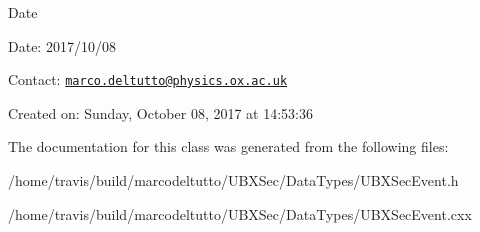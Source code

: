 \begin{DoxyDate}{Date}

\end{DoxyDate}
\begin{DoxyParagraph}{Date\-:}
2017/10/08 
\end{DoxyParagraph}


Contact\-: \href{mailto:marco.deltutto@physics.ox.ac.uk}{\tt marco.\-deltutto@physics.\-ox.\-ac.\-uk}

Created on\-: Sunday, October 08, 2017 at 14\-:53\-:36 

The documentation for this class was generated from the following files\-:\begin{DoxyCompactItemize}
\item 
/home/travis/build/marcodeltutto/\-U\-B\-X\-Sec/\-Data\-Types/U\-B\-X\-Sec\-Event.\-h\item 
/home/travis/build/marcodeltutto/\-U\-B\-X\-Sec/\-Data\-Types/U\-B\-X\-Sec\-Event.\-cxx\end{DoxyCompactItemize}
